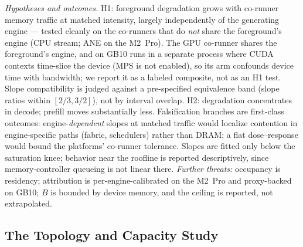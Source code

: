 \emph{Hypotheses and outcomes.} H1: foreground degradation grows with
co-runner memory traffic at matched intensity, largely independently of
the generating engine --- tested cleanly on the co-runners that do
\emph{not} share the foreground's engine (CPU stream; ANE on the M2~Pro).
The GPU co-runner shares the foreground's engine, and on GB10 runs in a
separate process where CUDA contexts time-slice the device (MPS is not
enabled), so its arm confounds device time with bandwidth; we report it as
a labeled composite, not as an H1 test. Slope compatibility is judged
against a pre-specified equivalence band (slope ratios within
$[2/3, 3/2]$), not by interval overlap. H2: degradation concentrates in decode; prefill
moves substantially less. Falsification branches are first-class outcomes:
engine-\emph{dependent} slopes at matched traffic would localize contention
in engine-specific paths (fabric, schedulers) rather than DRAM; a flat
dose--response would bound the platforms' co-runner tolerance. Slopes are fitted only
below the saturation knee; behavior near the roofline is reported
descriptively, since memory-controller queueing is not linear there.
\emph{Further threats:} occupancy is residency; attribution is
per-engine-calibrated on the M2~Pro and proxy-backed on GB10; $B$ is
bounded by device memory, and the ceiling is reported, not extrapolated.

\subsection{The Topology and Capacity Study}
\label{sec:setup-topology}


